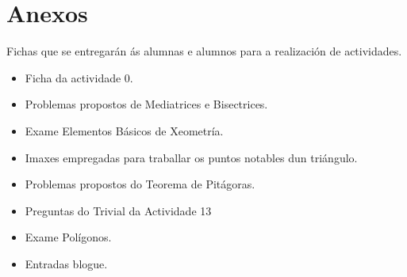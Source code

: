 

\chapter{Anexos}\label{chap:fich-act}

Fichas que se entregarán ás alumnas e alumnos para a realización de actividades.
\begin{itemize}
  \item Ficha da actividade 0.
  \item Problemas propostos de Mediatrices e Bisectrices.
  \item Exame Elementos Básicos de Xeometría.
  \item Imaxes empregadas para traballar os puntos notables dun triángulo.
  \item Problemas propostos do Teorema de Pitágoras.
  \item Preguntas do Trivial da Actividade 13
  \item Exame Polígonos.
  \item Entradas blogue.
\end{itemize}
\newpage









